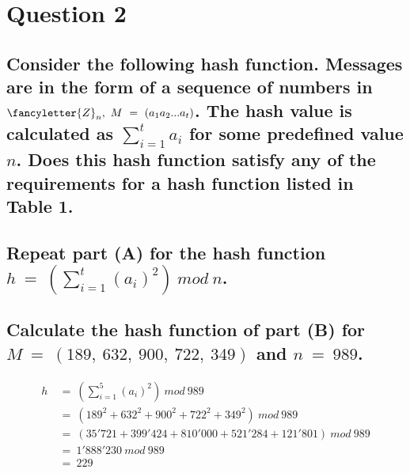 \documentclass{report}
\begin{document}
	\section{Question 2}
	\startsection
		\renewcommand{\thesubsection}{\thesection.\Alph{subsection}}
		\subsection{Consider the following hash function. Messages are in the form of a sequence of numbers in $\fancyletter{Z}_n, \ M \ = \ (a_1a_2...a_t)$. The hash value is calculated as $\sum_{i=1}^t a_i$ for some predefined value $n$. Does this hash function satisfy any of the requirements for a hash function listed in Table 1.}
		\startsubsection
		\closesection
		\subsection{Repeat part (A) for the hash function $h \ = \ \left(\sum_{i=1}^t (a_i)^2\right) \ mod \ n$.}
		\startsubsection
		\closesection
		\subsection{Calculate the hash function of part (B) for $M \ = \ (189, \ 632, \ 900, \ 722, \ 349)$ and $n \ = \ 989$.}
		\vspace*{-2em}
		\begin{align*}
			h \ & = \ \left(\sum_{i=1}^5 (a_i)^2\right) \ mod \ 989 \\
			& = \ (189^2 + 632^2 + 900^2 + 722^2 + 349^2) \ mod \ 989 \\
			& = \ (35'721 + 399'424 + 810'000 + 521'284 + 121'801) \ mod \ 989 \\
			& = \ 1'888'230 \ mod \ 989 \\
			& = \ 229
		\end{align*}
	\closesection
\end{document}
